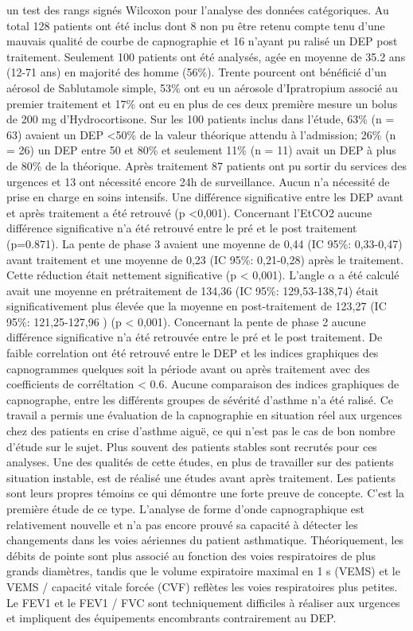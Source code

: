 \documentclass[12pt,]{article}
\begin{document}
un test des rangs signés Wilcoxon pour l'analyse des données
catégoriques. Au total 128 patients ont été inclus dont 8 non pu être
retenu compte tenu d'une mauvais qualité de courbe de capnographie et 16
n'ayant pu ralisé un DEP post traitement. Seulement 100 patients ont été
analysés, agée en moyenne de 35.2 ans (12-71 ans) en majorité des homme
(56\%). Trente pourcent ont bénéficié d'un aérosol de Sablutamole
simple, 53\% ont eu un aérosole d'Ipratropium associé au premier
traitement et 17\% ont eu en plus de ces deux première mesure un bolus
de 200 mg d'Hydrocortisone. Sur les 100 patients inclus dans l'étude,
63\% (n = 63) avaient un DEP \textless{}50\% de la valeur théorique
attendu à l'admission; 26\% (n = 26) un DEP entre 50 et 80\% et
seulement 11\% (n = 11) avait un DEP à plus de 80\% de la théorique.
Après traitement 87 patients ont pu sortir du services des urgences et
13 ont nécessité encore 24h de surveillance. Aucun n'a nécessité de
prise en charge en soins intensifs. Une différence significative entre
les DEP avant et après traitement a été retrouvé (p \textless{}0,001).
Concernant l'EtCO2 aucune différence significative n'a été retrouvé
entre le pré et le post traitement (p=0.871). La pente de phase 3
avaient une moyenne de 0,44 (IC 95\%: 0,33-0,47) avant traitement et une
moyenne de 0,23 (IC 95\%: 0,21-0,28) après le traitement. Cette
réduction était nettement significative (p \textless{} 0,001). L'angle
\(\alpha\) a été calculé avait une moyenne en prétraitement de 134,36
(IC 95\%: 129,53-138,74) était significativement plus élevée que la
moyenne en post-traitement de 123,27 (IC 95\%: 121,25-127,96 ) (p
\textless{} 0,001). Concernant la pente de phase 2 aucune différence
significative n'a été retrouvée entre le pré et le post traitement. De
faible correlation ont été retrouvé entre le DEP et les indices
graphiques des capnogrammes quelques soit la période avant ou après
traitement avec des coefficients de corréltation \textless{} 0.6. Aucune
comparaison des indices graphiques de capnographe, entre les différents
groupes de sévérité d'asthme n'a été ralisé. Ce travail a permis une
évaluation de la capnographie en situation réel aux urgences chez des
patients en crise d'asthme aiguë, ce qui n'est pas le cas de bon nombre
d'étude sur le sujet. Plus souvent des patients stables sont recrutés
pour ces analyses. Une des qualités de cette études, en plus de
travailler sur des patients situation instable, est de réalisé une
études avant après traitement. Les patients sont leurs propres témoins
ce qui démontre une forte preuve de concepte. C'est la première étude de
ce type. L'analyse de forme d'onde capnographique est relativement
nouvelle et n'a pas encore prouvé sa capacité à détecter les changements
dans les voies aériennes du patient asthmatique. Théoriquement, les
débits de pointe sont plus associé au fonction des voies respiratoires
de plus grands diamètres, tandis que le volume expiratoire maximal en 1
s (VEMS) et le VEMS / capacité vitale forcée (CVF) reflètes les voies
respiratoires plus petites. Le FEV1 et le FEV1 / FVC sont techniquement
difficiles à réaliser aux urgences et impliquent des équipements
encombrants contrairement au DEP.
\end{document}
